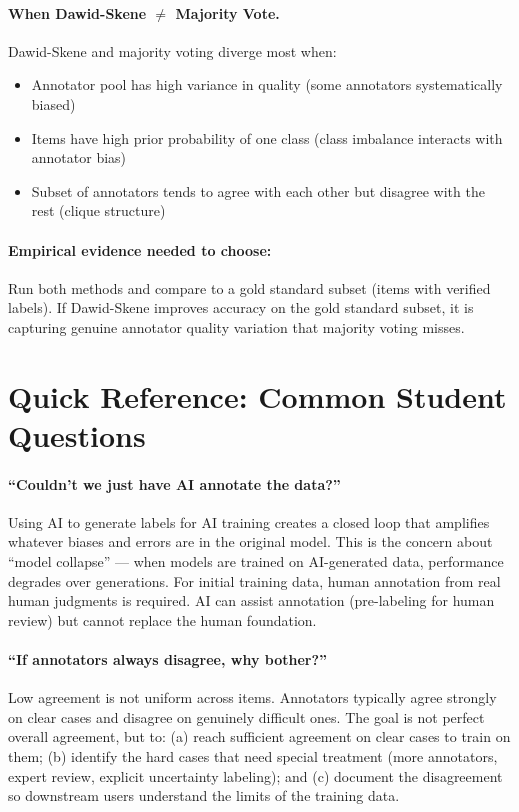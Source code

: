 \paragraph{When Dawid-Skene $\neq$ Majority Vote.}
Dawid-Skene and majority voting diverge most when:
\begin{itemize}
    \item Annotator pool has high variance in quality (some annotators systematically biased)
    \item Items have high prior probability of one class (class imbalance interacts with annotator bias)
    \item Subset of annotators tends to agree with each other but disagree with the rest (clique structure)
\end{itemize}

\paragraph{Empirical evidence needed to choose:} Run both methods and compare to a gold standard subset (items with verified labels). If Dawid-Skene improves accuracy on the gold standard subset, it is capturing genuine annotator quality variation that majority voting misses.

\section{Quick Reference: Common Student Questions}

\paragraph{``Couldn't we just have AI annotate the data?''}
Using AI to generate labels for AI training creates a closed loop that amplifies whatever biases and errors are in the original model. This is the concern about ``model collapse'' --- when models are trained on AI-generated data, performance degrades over generations. For initial training data, human annotation from real human judgments is required. AI can assist annotation (pre-labeling for human review) but cannot replace the human foundation.

\paragraph{``If annotators always disagree, why bother?''}
Low agreement is not uniform across items. Annotators typically agree strongly on clear cases and disagree on genuinely difficult ones. The goal is not perfect overall agreement, but to: (a) reach sufficient agreement on clear cases to train on them; (b) identify the hard cases that need special treatment (more annotators, expert review, explicit uncertainty labeling); and (c) document the disagreement so downstream users understand the limits of the training data.

